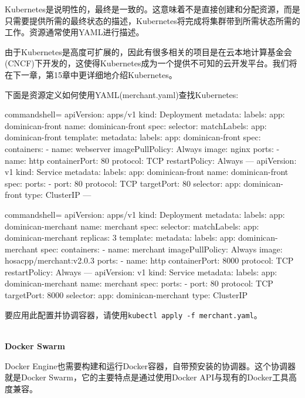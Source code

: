 Kubernetes是说明性的，最终是一致的。这意味着不是直接创建和分配资源，而是只需要提供所需的最终状态的描述，Kubernetes将完成将集群带到所需状态所需的工作。资源通常使用YAML进行描述。

由于Kubernetes是高度可扩展的，因此有很多相关的项目是在云本地计算基金会(CNCF)下开发的，这使得Kubernetes成为一个提供不可知的云开发平台。我们将在下一章，第15章中更详细地介绍Kubernetes。

下面是资源定义如何使用YAML(merchant.yaml)查找Kubernetes:

\begin{tcblisting}{commandshell={}}
apiVersion: apps/v1
kind: Deployment
metadata:
  labels:
    app: dominican-front
  name: dominican-front
spec:
  selector:
    matchLabels:
      app: dominican-front
  template:
    metadata:
      labels:
        app: dominican-front
    spec:
      containers:
        - name: webserver
          imagePullPolicy: Always
          image: nginx
          ports:
            - name: http
              containerPort: 80
              protocol: TCP
      restartPolicy: Always
---
apiVersion: v1
kind: Service
metadata:
  labels:
    app: dominican-front
  name: dominican-front
spec:
  ports:
    - port: 80
      protocol: TCP
      targetPort: 80
  selector:
    app: dominican-front
  type: ClusterIP
---
\end{tcblisting}
\begin{tcblisting}{commandshell={}}
apiVersion: apps/v1
kind: Deployment
metadata:
  labels:
    app: dominican-merchant
  name: merchant
spec:
  selector:
    matchLabels:
      app: dominican-merchant
  replicas: 3
  template:
    metadata:
      labels:
        app: dominican-merchant
  spec:
    containers:
      - name: merchant
        imagePullPolicy: Always
        image: hosacpp/merchant:v2.0.3
        ports:
          - name: http
            containerPort: 8000
            protocol: TCP
    restartPolicy: Always
---
apiVersion: v1
kind: Service
metadata:
  labels:
    app: dominican-merchant
  name: merchant
spec:
  ports:
    - port: 80
      protocol: TCP
      targetPort: 8000
  selector:
    app: dominican-merchant
    type: ClusterIP
\end{tcblisting}

要应用此配置并协调容器，请使用\texttt{kubectl apply -f merchant.yaml}。

\hspace*{\fill} \\ %
\noindent
\textbf{Docker Swarm}

Docker Engine也需要构建和运行Docker容器，自带预安装的协调器。这个协调器就是Docker Swarm，它的主要特点是通过使用Docker API与现有的Docker工具高度兼容。

